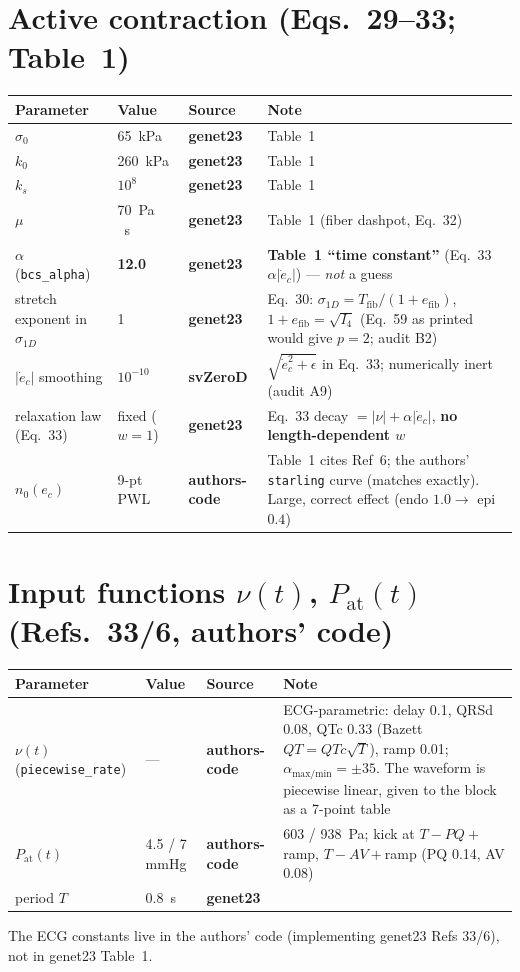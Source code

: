 \documentclass[10pt]{article}
\newcommand{\gen}{\textcolor{cgen}{\textbf{genet23}}}
\newcommand{\code}{\textcolor{ccode}{\textbf{authors-code}}}
\newcommand{\svz}{\textcolor{csvz}{\textbf{svZeroD}}}
\begin{document}
\section*{Active contraction (Eqs.~29--33; Table~1)}
\begin{longtable}{l l l P{6.6cm}}
\toprule Parameter & Value & Source & Note \\ \midrule\endhead
$\sigma_0$ & \SI{65}{kPa} & \gen & Table~1 \\
$k_0$      & \SI{260}{kPa} & \gen & Table~1 \\
$k_s$      & $10^8$ & \gen & Table~1 \\
$\mu$      & \SI{70}{Pa\,s} & \gen & Table~1 (fiber dashpot, Eq.~32) \\
$\alpha$ (\texttt{bcs\_alpha}) & \textbf{12.0} & \gen & \textbf{Table~1 ``time constant''} (Eq.~33 $\alpha|\dot e_c|$) --- \emph{not} a guess \\
stretch exponent in $\sigma_{1D}$ & 1 & \gen & Eq.~30: $\sigma_{1D}=T_\text{fib}/(1{+}e_\text{fib})$, $1{+}e_\text{fib}=\sqrt{I_4}$ (Eq.~59 as printed would give $p{=}2$; audit B2) \\
$|\dot e_c|$ smoothing & $10^{-10}$ & \svz & $\sqrt{\dot e_c^2+\epsilon}$ in Eq.~33; numerically inert (audit A9) \\
relaxation law (Eq.~33) & fixed ($w{=}1$) & \gen & Eq.~33 decay $=|\nu|+\alpha|\dot e_c|$, \textbf{no length-dependent $w$} \\
$n_0(e_c)$ & 9-pt PWL & \code & Table~1 cites Ref~6; the authors' \texttt{starling} curve (matches exactly). Large, correct effect (endo $1.0\to$ epi $0.4$) \\
\bottomrule
\end{longtable}

\section*{Input functions $\nu(t)$, $P_\text{at}(t)$ (Refs.~33/6, authors' code)}
\begin{longtable}{l l l P{6.6cm}}
\toprule Parameter & Value & Source & Note \\ \midrule\endhead
$\nu(t)$ (\texttt{piecewise\_rate}) & --- & \code & ECG-parametric: delay 0.1, QRSd 0.08, QTc 0.33 (Bazett $QT{=}QTc\sqrt{T}$), ramp 0.01; $\alpha_\text{max/min}{=}\pm35$. The waveform is piecewise linear, given to the block as a 7-point table \\
$P_\text{at}(t)$ & 4.5 / 7 mmHg & \code & 603 / \SI{938}{Pa}; kick at $T{-}PQ{+}$ramp, $T{-}AV{+}$ramp (PQ 0.14, AV 0.08) \\
period $T$ & \SI{0.8}{s} & \gen & \\
\bottomrule
\end{longtable}
\noindent\footnotesize The ECG constants live in the authors' code (implementing genet23 Refs 33/6), not in genet23 Table~1. \normalsize
\end{document}
